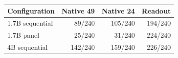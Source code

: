 \begin{tabular}{lrrr}\toprule
Configuration & Native 49 & Native 24 & Readout\\\midrule
1.7B sequential & 89/240 & 105/240 & 194/240\\
1.7B panel & 25/240 & 31/240 & 224/240\\
4B sequential & 142/240 & 159/240 & 226/240\\
\bottomrule\end{tabular}